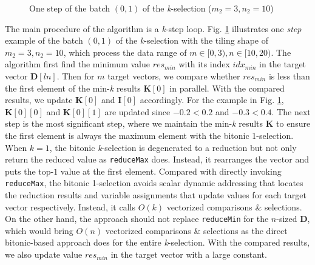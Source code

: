 \begin{figure}[tbp]
    \caption{One step of the batch $(0, 1)$ of the \textit{k}-selection ($m_2 = 3, n_2 = 10$)}
    \label{fig:single_k_sel}
    \end{figure}

The main procedure of the algorithm is a \textit{k}-step loop. Fig. \ref{fig:single_k_sel} illustrates one \textit{step} example of the batch $(0, 1)$ of the \textit{k}-selection with the tiling shape of $m_2 = 3, n_2 = 10$, which process the data range of $m \in [0, 3), n \in [10, 20)$. The algorithm first find the minimum value $res_{min}$ with its index $idx_{min}$ in the target vector $\textbf{D}[ln]$. Then for $m$ target vectors, we compare whether $res_{min}$ is less than the first element of the min-\textit{k} results $\textbf{K}[0]$ in parallel. With the compared results, we update $\textbf{K}[0]$ and $\textbf{I}[0]$ accordingly. For the example in Fig. \ref{fig:single_k_sel}, $\textbf{K}[0][0]$ and $\textbf{K}[0][1]$ are updated since $-0.2 < 0.2$ and $-0.3 < 0.4$. The next step is the most significant step, where we maintain the min-\textit{k} results $\textbf{K}$ to ensure the first element is always the maximum element with the bitonic 1-selection. When $k=1$, the bitonic \textit{k}-selection is degenerated to a reduction but not only return the reduced value as \verb|reduceMax| does. Instead, it rearranges the vector and puts the top-$1$ value at the first element. Compared with directly invoking \verb|reduceMax|, the bitonic 1-selection avoids scalar dynamic addressing that locates the reduction results and variable assignments that update values for each target vector respectively. Instead, it calls $O(k)$ vectorized comparisons \& selections. On the other hand, the approach should not replace \verb|reduceMin| for the $n$-sized $\textbf{D}$, which would bring $O(n)$ vectorized comparisons \& selections as the direct bitonic-based approach does for the entire \textit{k}-selection. With the compared results, we also update value $res_{min}$ in the target vector with a large constant. 

